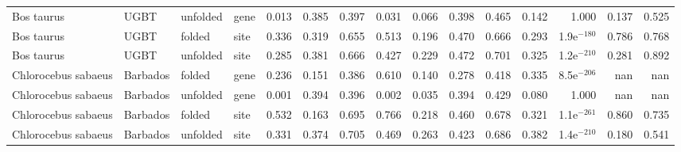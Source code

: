 \begin{longtable}{llllrrrrrrrrrrr}
          Bos taurus &                      UGBT &  unfolded &  gene &                              0.013 &                               0.385 &                 0.397 &                 0.031 &                              0.066 &                               0.398 &                 0.465 &                 0.142 &         1.000 &  0.137 &  0.525 \\
          Bos taurus &                      UGBT &    folded &  site &                              0.336 &                               0.319 &                 0.655 &                 0.513 &                              0.196 &                               0.470 &                 0.666 &                 0.293 & 1.9e$^{-180}$ &  0.786 &  0.768 \\
          Bos taurus &                      UGBT &  unfolded &  site &                              0.285 &                               0.381 &                 0.666 &                 0.427 &                              0.229 &                               0.472 &                 0.701 &                 0.325 & 1.2e$^{-210}$ &  0.281 &  0.892 \\
 Chlorocebus sabaeus &                  Barbados &    folded &  gene &                              0.236 &                               0.151 &                 0.386 &                 0.610 &                              0.140 &                               0.278 &                 0.418 &                 0.335 & 8.5e$^{-206}$ &    nan &    nan \\
 Chlorocebus sabaeus &                  Barbados &  unfolded &  gene &                              0.001 &                               0.394 &                 0.396 &                 0.002 &                              0.035 &                               0.394 &                 0.429 &                 0.080 &         1.000 &    nan &    nan \\
 Chlorocebus sabaeus &                  Barbados &    folded &  site &                              0.532 &                               0.163 &                 0.695 &                 0.766 &                              0.218 &                               0.460 &                 0.678 &                 0.321 & 1.1e$^{-261}$ &  0.860 &  0.735 \\
 Chlorocebus sabaeus &                  Barbados &  unfolded &  site &                              0.331 &                               0.374 &                 0.705 &                 0.469 &                              0.263 &                               0.423 &                 0.686 &                 0.382 & 1.4e$^{-210}$ &  0.180 &  0.541 \\

\end{longtable}
